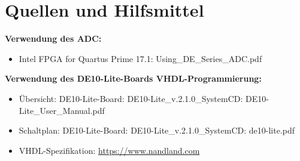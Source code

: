 \section{Quellen und Hilfsmittel}
\textbf{Verwendung des ADC:}
\begin{itemize}
\item Intel FPGA for Quartus Prime 17.1: Using\_DE\_Series\_ADC.pdf
\end{itemize}
\textbf{Verwendung des DE10-Lite-Boards VHDL-Programmierung:}
\begin{itemize}
\item
Übersicht: DE10-Lite-Board: DE10-Lite\_v.2.1.0\_SystemCD: DE10-Lite\_User\_Manual.pdf
\item
\label{Schaltplan_FPGA}
Schaltplan: DE10-Lite-Board: DE10-Lite\_v.2.1.0\_SystemCD: de10-lite.pdf
\item
VHDL-Spezifikation: \url{https://www.nandland.com}
\end{itemize}